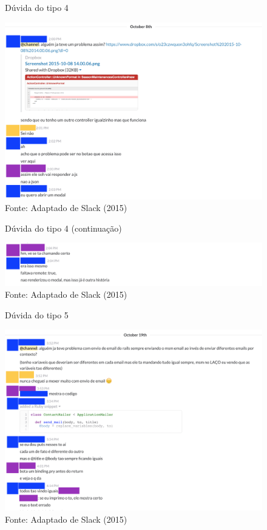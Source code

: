 \begin{figure}[h]
	\centering
    \caption{Dúvida do tipo 4}
    \includegraphics[width=15cm]{Imagens/c-type-4-1-1.png}
	\caption*{Fonte: Adaptado de Slack (2015)}
\end{figure}

\begin{figure}[h]
	\centering
    \caption{Dúvida do tipo 4 (continuação)}
    \includegraphics[width=15cm]{Imagens/c-type-4-1-2.png}
	\caption*{Fonte: Adaptado de Slack (2015)}
\end{figure}

\begin{figure}[h]
	\centering
    \caption{Dúvida do tipo 5}
    \includegraphics[width=15cm]{Imagens/c-type-5-2-1.png}
	\caption*{Fonte: Adaptado de Slack (2015)}
\end{figure}



